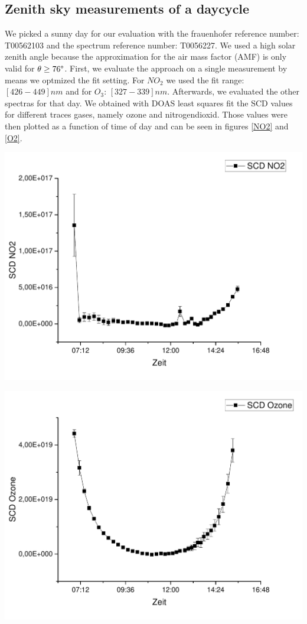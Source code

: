 \documentclass[12pt, english]{scrartcl} %
\newenvironment{Figure}
  {\par\medskip\noindent\minipage{\linewidth}}
  {\endminipage\par\medskip}
\begin{document}
\begin{multicols}{2}
\subsection{Zenith sky measurements of a daycycle}
We picked a sunny day for our evaluation with the frauenhofer reference number: T00562103 and the spectrum reference number: T0056227. We used a high solar zenith angle because the approximation for the air mass factor (AMF) is only valid for $\theta \geq 76 \degree$. First, we evaluate the approach on a single measurement by means we optmized the fit setting. For $NO_2$ we used the fit range: $[426-449] nm$ and for $O_3$: $[327-339] nm$. Afterwards, we evaluated the other spectras for that day.
We obtained with DOAS least squares fit the SCD values for different traces gases, namely ozone and nitrogendioxid. Those values were then plotted as a function of time of day and can be seen in figures \ref{NO2} and \ref{O2}.
\begin{Figure}
 \centering
 \captionsetup{format=plain}
 \includegraphics[width=\linewidth]{graphics/SCDNO2.pdf}
 \label{NO2}
\end{Figure}
\begin{Figure}
 \centering
 \captionsetup{format=plain}
 \includegraphics[width=\linewidth]{graphics/SCDOzone2.pdf}

\end{Figure}
\end{multicols}
\end{document}
